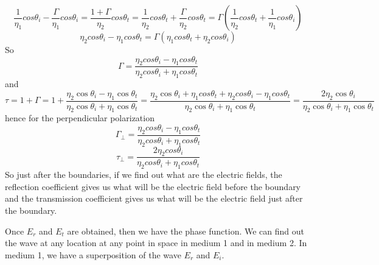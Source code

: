 \begin{dmath*}
\frac{1}{\eta_{1}}cos\theta_{i} - \frac{\Gamma}{\eta_{1}}cos\theta_{i} = \frac{1+\Gamma}{\eta_{2}}cos\theta_{t} = \frac{1}{\eta_{2}}cos\theta_{t} + \frac{\Gamma}{\eta_{2}}cos\theta_{t}
= \Gamma( \frac{1}{\eta_{2}}cos\theta_{t} + \frac{1}{\eta_{1}}cos\theta_{i})
\end{dmath*}
$$\eta_{2}cos\theta_{i} - \eta_{1}cos\theta_{t} = \Gamma(\eta_{1}cos\theta_{t} + \eta_{2}cos\theta_{i})$$
So
$$\Gamma = \frac{\eta_{2}cos\theta_{i} - \eta_{1}cos\theta_{t}}{\eta_{2}cos\theta_{i} + \eta_{1}cos\theta_{t}}$$
and
\begin{dmath*}
\tau = 1 + \Gamma = 1 + \frac{\eta_{2}\cos\theta_{i} - \eta_{1}\cos\theta_{t}}{\eta_{2}\cos\theta_{i} + \eta_{1}\cos\theta_{t}}
= \frac{\eta_{2}\cos\theta_{i} + \eta_{1}cos\theta_{t} + \eta_{2}cos\theta_{i} - \eta_{1}cos\theta_{t}}{\eta_{2}\cos\theta_{i} + \eta_{1}\cos\theta_{t}} = \frac{2 \eta_{2}\cos\theta_{i}}{\eta_{2}\cos\theta_{i} + \eta_{1}\cos\theta_{t}}
\end{dmath*}
hence for the perpendicular polarization
\begin{dmath}
\Gamma_{\perp} = \frac{\eta_{2}cos\theta_{i} - \eta_{1}cos\theta_{t}}{\eta_{2}cos\theta_{i} + \eta_{1}cos\theta_{t}}
\end{dmath}
\begin{dmath}
\tau_{\perp} = \frac{2 \eta_{2}cos\theta_{i}}{\eta_{2}cos\theta_{i} + \eta_{1}cos\theta_{t}}
\end{dmath}
So just after the boundaries, if we find out what are the electric fields, the reflection coefficient gives us what will be the electric field before the boundary and the transmission coefficient gives us what will be the electric field just after the boundary.

Once $E_{r}$ and $E_{t}$ are obtained, then we have the phase function. We can find out the wave at any location at any point in space in medium 1 and in medium 2. In medium  1, we have a superposition of the wave $E_{r}$ and $E_{i}$.

